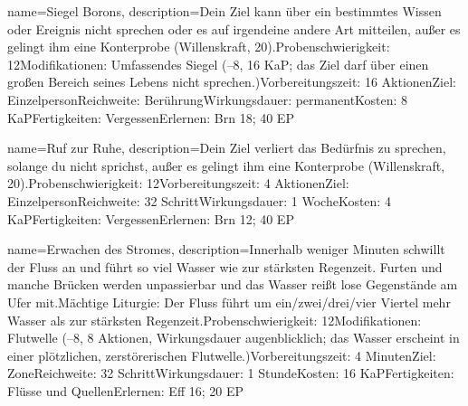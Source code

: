 {
    name={Siegel Borons},
    description={Dein Ziel kann über ein bestimmtes Wissen oder Ereignis nicht sprechen oder es auf irgendeine andere Art mitteilen, außer es gelingt ihm eine Konterprobe (Willenskraft, 20).\newline Probenschwierigkeit: 12\newline Modifikationen: Umfassendes Siegel (–8, 16 KaP; das Ziel darf über einen großen Bereich seines Lebens nicht sprechen.)\newline Vorbereitungszeit: 16 Aktionen\newline Ziel: Einzelperson\newline Reichweite: Berührung\newline Wirkungsdauer: permanent\newline Kosten: 8 KaP\newline Fertigkeiten: Vergessen\newline Erlernen: Brn 18; 40 EP}
}


{
    name={Ruf zur Ruhe},
    description={Dein Ziel verliert das Bedürfnis zu sprechen, solange du nicht sprichst, außer es gelingt ihm eine Konterprobe (Willenskraft, 20).\newline Probenschwierigkeit: 12\newline Vorbereitungszeit: 4 Aktionen\newline Ziel: Einzelperson\newline Reichweite: 32 Schritt\newline Wirkungsdauer: 1 Woche\newline Kosten: 4 KaP\newline Fertigkeiten: Vergessen\newline Erlernen: Brn 12; 40 EP}
}


{
    name={Erwachen des Stromes},
    description={Innerhalb weniger Minuten schwillt der Fluss an und führt so viel Wasser wie zur stärksten Regenzeit. Furten und manche Brücken werden unpassierbar und das Wasser reißt lose Gegenstände am Ufer mit.\newline Mächtige Liturgie: Der Fluss führt um ein/zwei/drei/vier Viertel mehr Wasser als zur stärksten Regenzeit.\newline Probenschwierigkeit: 12\newline Modifikationen: Flutwelle (–8, 8 Aktionen, Wirkungsdauer augenblicklich; das Wasser erscheint in einer plötzlichen, zerstörerischen Flutwelle.)\newline Vorbereitungszeit: 4 Minuten\newline Ziel: Zone\newline Reichweite: 32 Schritt\newline Wirkungsdauer: 1 Stunde\newline Kosten: 16 KaP\newline Fertigkeiten: Flüsse und Quellen\newline Erlernen: Eff 16; 20 EP}
}


